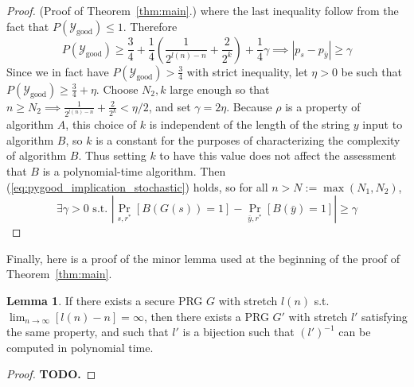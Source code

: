 \documentclass{article}
\def \Ygood{\mathcal{Y}_\text{good}}
\def \by{{\bar{y}}}
\theoremstyle{definition}
\newtheorem{lem}[thm]{Lemma}
\theoremstyle{remark}
\begin{document}
\begin{proof}{(Proof of Theorem~\ref{thm:main}.)}
where the last inequality follow from the fact that $P(\Ygood) \leq 1$.
Therefore
\begin{equation} \label{eq:pygood_implication_stochastic}
P(\Ygood) \geq \frac{3}{4} + \frac{1}{4}(\frac{1}{2^{l(n) - n}} + \frac{2}{2^k}) + \frac{1}{4} \gamma \implies |p_s - p_\by| \geq \gamma
\end{equation}
Since we in fact have $P(\Ygood) > \frac{3}{4}$ with strict inequality, let $\eta > 0$ be such that $P(\Ygood) \geq \frac{3}{4} + \eta$.
Choose $N_2, k$ large enough so that $n \geq N_2 \implies \frac{1}{2^{l(n) - n}} + \frac{2}{2^k} < \eta/2$, and set $\gamma = 2\eta$.
Because $\rho$ is a property of algorithm $A$, this choice of $k$ is independent of the length of the string $y$ input to algorithm $B$, so $k$ is a constant for the purposes of characterizing the complexity of algorithm $B$.
Thus setting $k$ to have this value does not affect the assessment that $B$ is a polynomial-time algorithm.
Then (\ref{eq:pygood_implication_stochastic}) holds, so for all $n > N := \max(N_1, N_2)$,
$$
\exists \gamma > 0 \text{ s.t. } |\Pr_{s, r^*}[B(G(s)) = 1] - \Pr_{\by, r^*}[B(\by) = 1]| \geq \gamma
$$

\end{proof}

Finally, here is a proof of the minor lemma used at the beginning of the proof of Theorem~\ref{thm:main}.
\begin{lem} \label{lem:bijective_stretch}
If there exists a secure PRG $G$ with stretch $l(n)$ 
s.t. $\lim_{n\to\infty}[l(n) - n] = \infty$, then
there exists a PRG $G'$ with stretch $l'$ satisfying the same property, and such that $l'$ is a bijection
such that $(l')^{-1}$ can be computed in polynomial time.
\end{lem}
\begin{proof}
\textbf{TODO.}
\end{proof}

\end{document}
